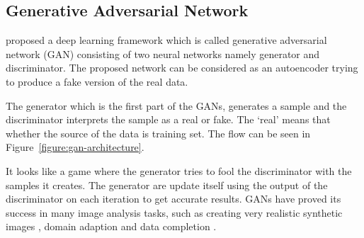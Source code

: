     \subsection{Generative Adversarial Network}

        \citet{goodfellow2014generative} proposed a deep learning framework which is called generative adversarial network (GAN) consisting of two neural networks namely generator and discriminator.
        The proposed network can be considered as an autoencoder trying to produce a fake version of the real data.

        The generator which is the first part of the GANs, generates a sample and the discriminator interprets the sample as a real or fake.
        The ‘real’ means that whether the source of the data is training set. The flow can be seen in Figure~\ref{figure:gan-architecture}.

        

        It looks like a game where the generator tries to fool the discriminator with the samples it creates.
        The generator are update itself using the output of the discriminator on each iteration to get accurate results.
        GANs have proved its success in many image analysis tasks, such as creating very realistic synthetic images \cite{shrivastava2017learning},
        domain adaption \cite{bousmalis2017unsupervised} and data completion \cite{yeh2017semantic}.
